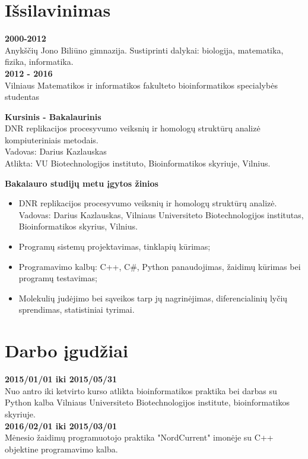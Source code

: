 \documentclass[a4paper,12pt]{article}
\begin{document}
\section{Išsilavinimas}
\textbf{2000-2012} \\
Anykščių Jono Biliūno gimnazija. Sustiprinti dalykai: biologija, matematika, fizika, informatika. \\

\textbf{2012 - 2016} \\ 
Vilniaus Matematikos ir informatikos fakulteto bioinformatikos specialybės studentas

\textbf{Kursinis - Bakalaurinis} \\
DNR replikacijos procesyvumo veiksnių ir homologų struktūrų analizė kompiuteriniais metodais. \\
Vadovas: Darius Kazlauskas\\
Atlikta: VU Biotechnologijos instituto, Bioinformatikos skyriuje, Vilnius. 

\textbf{Bakalauro studijų metu įgytos žinios}
\begin{itemize}
	\item DNR replikacijos procesyvumo veiksnių ir homologų struktūrų analizė. Vadovas: Darius Kazlauskas, Vilniaus Universiteto Biotechnologijos institutas, Bioinformatikos skyrius, Vilnius. 
	\item Programų sistemų projektavimas, tinklapių kūrimas;
	\item Programavimo kalbų: C++, C\#, Python panaudojimas, žaidimų kūrimas bei programų testavimas;
	\item Molekulių judėjimo bei sąveikos tarp jų nagrinėjimas, diferencialinių lyčių sprendimas, 
statistiniai tyrimai.
\end{itemize}

\clearpage

\vspace{8cm}


\section{Darbo įgudžiai}
\textbf{2015/01/01 iki 2015/05/31} \\
Nuo antro iki ketvirto kurso atlikta bioinformatikos praktika bei darbas su Python kalba Vilniaus Universiteto Biotechnologijos institute, bioinformatikos skyriuje. \\

\vspace{0.5cm}
\textbf{2016/02/01 iki 2015/03/01} \\
Mėnesio žaidimų programuotojo praktika "NordCurrent" imonėje su C++ objektine programavimo kalba.
\vspace{0.5cm}
\end{document}
